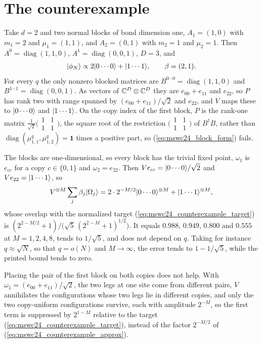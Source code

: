 \documentclass{article}
\begin{document}
\section{The counterexample}
Take $d=2$ and two normal blocks of bond dimension one, $A_1=(1,0)$ with
$m_1=2$ and $\mu_1=(1,1)$, and $A_2=(0,1)$ with $m_2=1$ and $\mu_2=1$. Then
$A^0=\operatorname{diag}(1,1,0)$, $A^1=\operatorname{diag}(0,0,1)$, $D=3$, and
\begin{align}
    |\phi_N\rangle\propto2|0\cdots0\rangle+|1\cdots1\rangle,\qquad
    \beta=(2,1).
    \label{eq:mswc24_counterexample_target}
\end{align}
For every $q$ the only nonzero blocked matrices are
$B^{0\cdots0}=\operatorname{diag}(1,1,0)$ and $B^{1\cdots1}=\operatorname{diag}(0,0,1)$.
As vectors of $\mathbb{C}^D\otimes\mathbb{C}^D$ they are $e_{00}+e_{11}$ and $e_{22}$, so
$P$ has rank two with range spanned by $(e_{00}+e_{11})/\sqrt2$ and $e_{22}$, and
$V$ maps these to $|0\cdots0\rangle$ and $|1\cdots1\rangle$. On the copy index of the
first block, $P$ is the rank-one matrix
$\tfrac1{\sqrt2}\bigl(\begin{smallmatrix}1&1\\1&1\end{smallmatrix}\bigr)$,
the square root of the restriction
$\bigl(\begin{smallmatrix}1&1\\1&1\end{smallmatrix}\bigr)$ of $B^\dagger B$,
rather than
$\operatorname{diag}(\mu_{1,1}^q,\mu_{1,2}^q)=\mathbf 1$ times a positive part, so
(\ref{eq:mswc24_block_form}) fails.

The blocks are one-dimensional, so every block has the trivial fixed point,
$\omega_1$ is $e_{cc}$ for a copy $c\in\{0,1\}$ and $\omega_2=e_{22}$. Then
$Ve_{cc}=|0\cdots0\rangle/\sqrt2$ and $Ve_{22}=|1\cdots1\rangle$, so
\begin{align}
    V^{\otimes M}\sum_j\beta_j|\Omega_j\rangle
    =2\cdot2^{-M/2}|0\cdots0\rangle^{\otimes M}+|1\cdots1\rangle^{\otimes M},
    \label{eq:mswc24_counterexample_approx}
\end{align}
whose overlap with the normalized target (\ref{eq:mswc24_counterexample_target}) is
$(2^{2-M/2}+1)/\bigl(\sqrt5\,(2^{2-M}+1)^{1/2}\bigr)$. It equals $0.988$, $0.949$,
$0.800$ and $0.555$ at $M=1,2,4,8$, tends to $1/\sqrt5$, and does not depend on
$q$. Taking for instance $q\approx\sqrt N$, so that $q=o(N)$ and $M\to\infty$, the
error tends to $1-1/\sqrt5$, while the printed bound tends to zero.

Placing the pair of the first block on both copies does not help. With
$\omega_1=(e_{00}+e_{11})/\sqrt2$, the two legs at one site come from different
pairs, $V$ annihilates the configurations whose two legs lie in different copies,
and only the two copy-uniform configurations survive, each with amplitude
$2^{-M}$, so the first term is suppressed by $2^{1-M}$ relative to the
target (\ref{eq:mswc24_counterexample_target}), instead of the factor
$2^{-M/2}$ of (\ref{eq:mswc24_counterexample_approx}).
\end{document}
